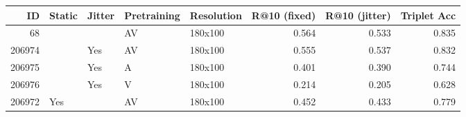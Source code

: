\begin{tabular}{rllllrrr}
\toprule
    ID & Static & Jitter & Pretraining & Resolution &  R@10 (fixed) &  R@10 (jitter) &  Triplet Acc \\
\midrule
    68 &        &        &          AV &    180x100 &         0.564 &          0.533 &        0.835 \\
206974 &        &    Yes &          AV &    180x100 &         0.555 &          0.537 &        0.832 \\
206975 &        &    Yes &           A &    180x100 &         0.401 &          0.390 &        0.744 \\
206976 &        &    Yes &           V &    180x100 &         0.214 &          0.205 &        0.628 \\
206972 &    Yes &        &          AV &    180x100 &         0.452 &          0.433 &        0.779 \\
\bottomrule
\end{tabular}

